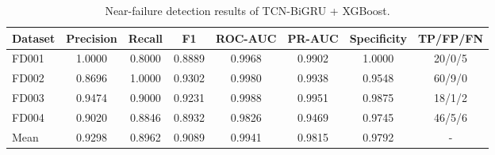 \begin{table}[!t]
\centering
\caption{Near-failure detection results of TCN-BiGRU + XGBoost.}
\label{tab:proposed\_results}
\begin{tabular}{lccccccc}
\hline
Dataset & Precision & Recall & F1 & ROC-AUC & PR-AUC & Specificity & TP/FP/FN \\
\hline
FD001 & 1.0000 & 0.8000 & 0.8889 & 0.9968 & 0.9902 & 1.0000 & 20/0/5 \\
FD002 & 0.8696 & 1.0000 & 0.9302 & 0.9980 & 0.9938 & 0.9548 & 60/9/0 \\
FD003 & 0.9474 & 0.9000 & 0.9231 & 0.9988 & 0.9951 & 0.9875 & 18/1/2 \\
FD004 & 0.9020 & 0.8846 & 0.8932 & 0.9826 & 0.9469 & 0.9745 & 46/5/6 \\
Mean & 0.9298 & 0.8962 & 0.9089 & 0.9941 & 0.9815 & 0.9792 & - \\
\hline
\end{tabular}
\end{table}
